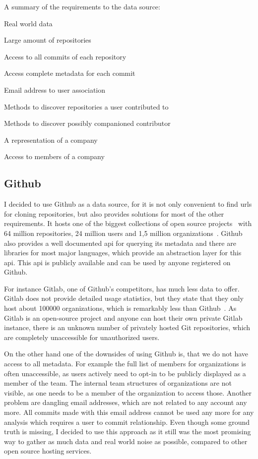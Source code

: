 \begin{itemlist}{A summary of the requirements to the data source:}
    \item Real world data
    \item Large amount of repositories
    \item Access to all commits of each repository
    \item Access complete metadata for each commit
    \item Email address to user association
    \item Methods to discover repositories a user contributed to
    \item Methods to discover possibly companioned contributor
    \item A representation of a company
    \item Access to members of a company
\end{itemlist}


\subsection{Github}\label{github}
I decided to use Github as a data source, for it is not only convenient to find \acp{url} for cloning repositories, but also provides solutions for most of the other requirements.
It hosts one of the biggest collections of open source projects~\cite{techreport:how-github-conquered} with 64 million repositories, 24 million users and 1,5 million organizations~\cite{article:github-statistics}.
Github also provides a well documented \ac{api} for querying its metadata and there are libraries for most major languages, which provide an abstraction layer for this \ac{api}.
This \ac{api} is publicly available and can be used by anyone registered on Github.

For instance Gitlab, one of Github's competitors, has much less data to offer.
Gitlab does not provide detailed usage statistics, but they state that they only host about 100000 organizations, which is remarkably less than Github~\cite{article:gitlab-help}.
As Gitlab is an open-source project and anyone can host their own private Gitlab instance, there is an unknown number of privately hosted Git repositories, which are completely unaccessible for unauthorized users.

On the other hand one of the downsides of using Github is, that we do not have access to all metadata.
For example the full list of members for organizations is often unaccessible, as users actively need to opt-in to be publicly displayed as a member of the team.
The internal team structures of organizations are not visible, as one needs to be a member of the organization to access those.
Another problem are dangling email addresses, which are not related to any account any more.
All commits made with this email address cannot be used any more for any analysis which requires a user to commit relationship.
Even though some ground truth is missing, I decided to use this approach as it still was the most promising way to gather as much data and real world noise as possible, compared to other open source hosting services.

